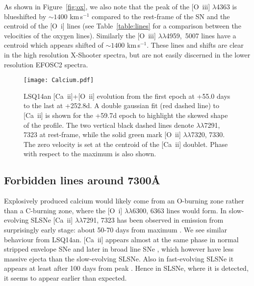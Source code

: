 \documentclass[useAMS,usenatbib]{mn2e}
\def\kms{km\,s$^{-1}$}
\def\an{LSQ14an}
\def\oiii{[O~{\sc iii}]}
\def\oi{[O~{\sc i}]}
\begin{document}
As shown in Figure~\ref{fig:ox}, we also note that the peak of the \oiii\/ $\lambda$4363 is blueshifted by $\sim1400$ \kms\/ 
compared to the rest-frame of the SN and the centroid of the \oi\/ lines (see Table~\ref{table:lines} for a comparison between the velocities of the oxygen lines). Similarly the 
 \oiii\/  $\lambda\lambda$4959,~5007 lines have a centroid which appears shifted of $\sim1400$ \kms\/. 
These lines and shifts are clear in the high resolution X-Shooter spectra, but are not easily discerned in the lower resolution EFOSC2 spectra. 

\begin{figure}
\texttt{[image: Calcium.pdf]}
\caption{\an\/ [Ca~{\sc ii}]+[O~{\sc ii}] evolution from the first epoch at +55.0 days to the last at +252.8d. A double gaussian fit (red dashed line) to [Ca~{\sc ii}] is shown for the +59.7d epoch to highlight the skewed shape of the profile. The two vertical black dashed lines denote $\lambda\lambda$7291, 7323 at rest-frame, while the solid green mark [O~{\sc ii}] $\lambda\lambda$7320, 7330. The zero velocity is set at the centroid of the [Ca~{\sc ii}] doublet. Phase with respect to the maximum is also shown.}
\label{fig:cal}
\end{figure}

\subsection{Forbidden lines around 7300\AA}\label{sec:ca2}
Explosively produced calcium would likely come from an O-burning zone rather than a C-burning zone, where the 
[O~{\sc i}] $\lambda\lambda$6300, 6363 lines would form. 
In slow-evolving SLSNe [Ca~{\sc ii}] $\lambda\lambda$7291, 7323
 has been observed in emission from surprisingly early stage:  about 50-70 days from maximum \citep[e.g. SNe 2007bi, 2015bn;][]{gy09,yo10,ni16a}. We see similar behaviour from  \an. [Ca~{\sc ii}] appears almost at the same phase in normal stripped envelope SNe \citep[after 60-70 days, e.g. SNe 1994I, 2007gr;][]{fi95,hun09} and later in broad line SNe \citep[after 100d, e.g. SN 1998bw;][]{pat01}, which however have less massive ejecta than the slow-evolving SLSNe. Also in fast-evolving SLSNe it appears at least after 100 days from peak \citep{kan16}. 
Hence in SLSNe, where it is detected, it seems to appear earlier than expected. 
\end{document}
